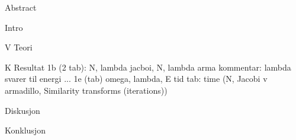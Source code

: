 

		Abstract

		Intro
		
V		Teori
						
			
K	
		Resultat
			1b (2 tab): N, lambda jacboi,
							  N, lambda arma
					kommentar: lambda svarer til energi ... 
			1e	 (tab) omega, lambda, E
			tid
			tab: time (N, Jacobi v armadillo, 			Similarity transforms (iterations))

		Diskusjon

			
		Konklusjon
		